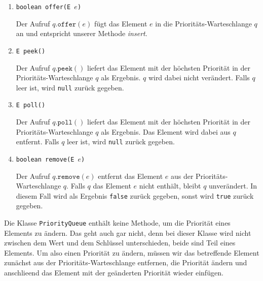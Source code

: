 \begin{enumerate}
\item \texttt{boolean offer(E $e$)}

      Der Aufruf $q.\mathtt{offer}(e)$ f\"ugt das Element $e$ in die
      Priorit\"ats-Warteschlange $q$ an und
      entspricht unserer Methode \textsl{insert}. 
\item \texttt{E peek()}

      Der Aufruf $q.\mathtt{peek}()$ liefert das Element mit der h\"ochsten Priorit\"at in der
      Priorit\"ats-Warte\-schlange $q$ als Ergebnis.   $q$ wird dabei nicht ver\"andert.  Falls $q$
      leer ist, wird \texttt{null} zur\"uck gegeben.
\item \texttt{E poll()}

      Der Aufruf $q.\mathtt{poll}()$ liefert das Element mit der h\"ochsten Priorit\"at in der
      Priorit\"ats-Warte\-schlange $q$ als Ergebnis.  
      Das Element wird dabei aus $q$ entfernt.  Falls $q$
      leer ist, wird \texttt{null} zur\"uck gegeben.
\item \texttt{boolean remove(E $e$)}

      Der Aufruf $q.\mathtt{remove}(e)$ entfernt das Element $e$ aus
      der Priorit\"ats-Warteschlange $q$.  Falls $q$ das Element $e$ nicht enth\"alt, bleibt
      $q$ unver\"andert.  In diesem Fall wird als Ergebnis \texttt{false} zur\"uck gegeben,
      sonst wird \texttt{true} zur\"uck gegeben.
\end{enumerate}
Die Klasse \texttt{PriorityQueue} enth\"alt keine Methode, um die Priorit\"at eines Elements
zu \"andern.  Das geht auch gar nicht, denn bei dieser Klasse wird nicht zwischen dem Wert
und dem Schl\"ussel unterschieden, beide sind Teil eines Elements.  Um also einen Priorit\"at
zu \"andern, m\"ussen wir das betreffende Element zun\"achst aus der Priorit\"ats-Warteschlange
entfernen, die Priorit\"at \"andern und anschlie\3end das Element mit der ge\"anderten Priorit\"at
wieder einf\"ugen.


%

